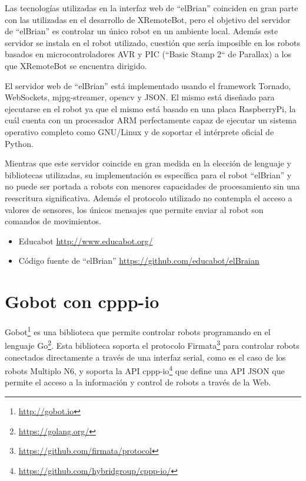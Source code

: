 Las tecnologías utilizadas en la interfaz web de ``elBrian'' coinciden en gran
parte con las utilizadas en el desarrollo de XRemoteBot, pero el objetivo del
servidor de ``elBrian'' es controlar un único robot en un ambiente local.
Además este servidor
se instala en el robot utilizado,  cuestión que sería imposible en los
robots basados en
microcontroladores AVR y PIC (``Basic Stamp 2`` de Parallax)
a los que XRemoteBot se encuentra dirigido.


El servidor web de ``elBrian'' está implementado usando el framework Tornado,
WebSockets, mjpg-streamer, opencv y JSON. El mismo está diseñado para ejecutarse
en el robot ya que el mismo está basado en una placa RaspberryPi, la cuál
cuenta con un procesador ARM perfectamente capaz de ejecutar un sistema
operativo completo como GNU/Linux y de soportar el intérprete oficial de Python.

Mientras que este servidor coincide en gran medida en la elección de lenguaje
y bibliotecas utilizadas, su implementación es específica para el robot ``elBrian''
y no puede ser portada a robots con menores capacidades de procesamiento
sin una reescritura significativa. Además el protocolo utilizado no contempla
el acceso a valores de sensores, los únicos mensajes que permite enviar
al robot son comandos de movimientos.

\begin{itemize}
    \item Educabot \url{http://www.educabot.org/}
    \item Código fuente de ``elBrian'' \url{https://github.com/educabot/elBraian}
\end{itemize}

\section{Gobot con cppp-io}

Gobot\footnote{\url{http://gobot.io}}
es una biblioteca que permite controlar robots programando en el lenguaje
Go\footnote{\url{https://golang.org/}}. Esta biblioteca soporta el
protocolo Firmata\footnote{\url{https://github.com/firmata/protocol}}
para controlar robots
conectados directamente a través de una interfaz serial, como es el caso
de los robots Multiplo N6, y soporta la API
cppp-io\footnote{\url{https://github.com/hybridgroup/cppp-io/}}
que define una API JSON
que permite el acceso a la información y control de robots a través de la Web.

